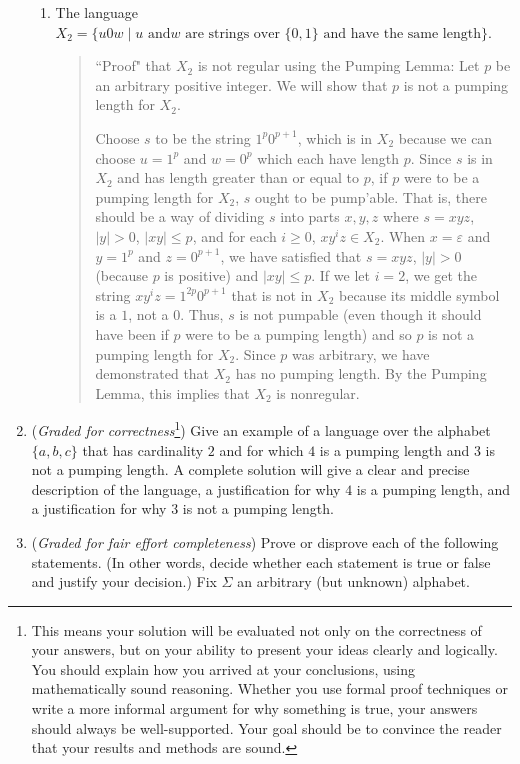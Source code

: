 \begin{enumerate}
\begin{enumerate}
\item The language $X_2 = \{ u0w \mid \text{$u$ and
$w$ are strings over $\{0,1\}$ and have the same length} \}$.

\begin{quote}
``Proof" that $X_2$ is not regular using the Pumping Lemma: Let $p$ be 
an arbitrary positive integer. We will show that $p$ is not a pumping length for $X_2$. 

Choose $s$ to be the string $1^{p} 0^{p+1}$, which is in $X_2$ because
we can choose $u = 1^p$ and $w = 0^p$ which each have length $p$.
Since $s$ is in $X_2$ and has length greater than or equal to $p$, if $p$ were to be a
pumping length for $X_2$, $s$ ought to be pump'able. 
That is, there should be a way of dividing $s$ into parts $x,y,z$ where $s=xyz$,
$|y| >0$, $|xy| \leq p$, and for each $i \geq 0$, $xy^iz \in X_2$.
When $x = \varepsilon$ and $y = 1^{p}$ and $z = 0^{p+1}$,
we have satisfied that $s = xyz$, $|y| > 0$ (because $p$ is positive) and $|xy| \leq p$.
If we let $i=2$, we get 
the string $xy^iz = 1^{2p}0^{p+1}$ that is not in $X_2$ because its middle symbol is a $1$, not a $0$. 
Thus, $s$ is not pumpable (even though it should have been if $p$ were to be a pumping length)
and so $p$ is not a pumping length for $X_2$.  Since $p$ was arbitrary, we have
demonstrated that $X_2$ has no pumping length.  By the Pumping Lemma, this implies that 
$X_2$ is nonregular.
\end{quote}
\end{enumerate}

\item ({\it Graded for correctness}\footnote{This means your solution will be
evaluated not only on the correctness of your answers, but on your ability to 
present your ideas clearly and logically. You should explain how you arrived at 
your conclusions, using  mathematically sound reasoning. Whether you use formal proof techniques or 
write a more informal argument for why 
something is true, your answers should always be well-supported. Your goal 
should be to convince the reader that 
your results and methods are sound.}) Give an example of a language
over the alphabet $\{a,b,c\}$ that has cardinality $2$ and for which $4$ is a pumping length
and $3$ is not a pumping length.  A complete solution will give a clear and precise
description of the language, a justification for why $4$ is a pumping length, and a 
justification for why $3$ is not a pumping length.

\item  ({\it Graded for fair effort completeness})
Prove or disprove each of the following statements. (In other words, 
decide whether each statement is true or false and justify your decision.)
Fix $\Sigma$ an arbitrary (but unknown) alphabet.


\end{enumerate}
